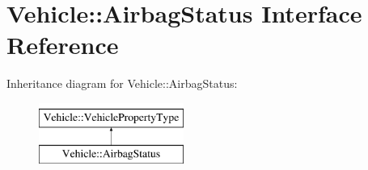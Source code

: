 \hypertarget{interfaceVehicle_1_1AirbagStatus}{\section{Vehicle\-:\-:Airbag\-Status Interface Reference}
\label{interfaceVehicle_1_1AirbagStatus}
}
Inheritance diagram for Vehicle\-:\-:Airbag\-Status\-:\begin{figure}[H]
\begin{center}
\leavevmode
\includegraphics[height=2.000000cm]{interfaceVehicle_1_1AirbagStatus}
\end{center}
\end{figure}
